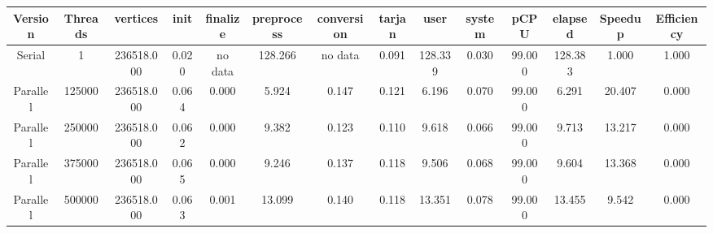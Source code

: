 \begin{tabular}{|c|c|c|c|c|c|c|c|c|c|c|c|c|c|}
\toprule
 Version &  Threads &   vertices &  init & finalize &  preprocess & conversion &  tarjan &    user &  system &   pCPU &  elapsed &  Speedup &  Efficiency \\
\midrule
  Serial &        1 & 236518.000 & 0.020 &  no data &     128.266 &    no data &   0.091 & 128.339 &   0.030 & 99.000 &  128.383 &    1.000 &       1.000 \\
Parallel &   125000 & 236518.000 & 0.064 &    0.000 &       5.924 &      0.147 &   0.121 &   6.196 &   0.070 & 99.000 &    6.291 &   20.407 &       0.000 \\
Parallel &   250000 & 236518.000 & 0.062 &    0.000 &       9.382 &      0.123 &   0.110 &   9.618 &   0.066 & 99.000 &    9.713 &   13.217 &       0.000 \\
Parallel &   375000 & 236518.000 & 0.065 &    0.000 &       9.246 &      0.137 &   0.118 &   9.506 &   0.068 & 99.000 &    9.604 &   13.368 &       0.000 \\
Parallel &   500000 & 236518.000 & 0.063 &    0.001 &      13.099 &      0.140 &   0.118 &  13.351 &   0.078 & 99.000 &   13.455 &    9.542 &       0.000 \\
\bottomrule
\end{tabular}
